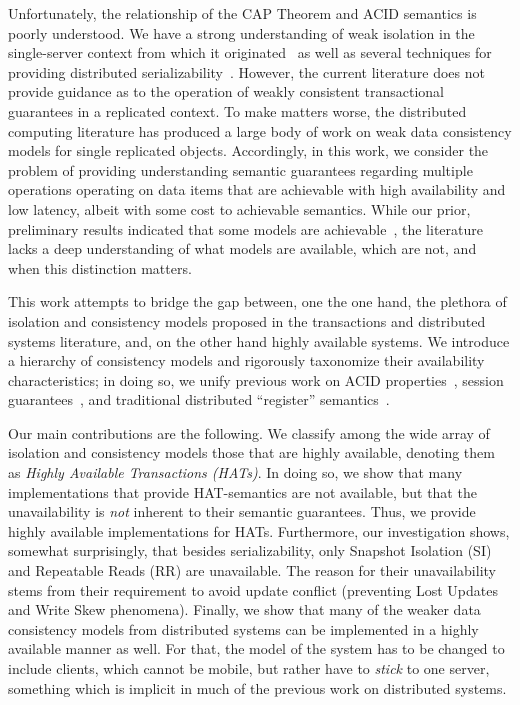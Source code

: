 Unfortunately, the relationship of the CAP Theorem and ACID semantics
is poorly understood. We have a strong understanding of weak isolation
in the single-server context from which it originated~\cite{adya,
  ansicritique, gray-isolation} as well as several techniques for
providing distributed serializability~\cite{bernstein-concurrency,
  spanner, granola, daudjee-session, calvin}.  However, the current
literature does not provide guidance as to the operation of weakly
consistent transactional guarantees in a replicated context. To make
matters worse, the distributed computing literature has produced a
large body of work on weak data consistency models for single
replicated objects. Accordingly, in this work, we consider the problem
of providing understanding semantic guarantees regarding multiple
operations operating on data items that are achievable with high
availability and low latency, albeit with some cost to achievable
semantics. While our prior, preliminary results indicated that some
models are achievable~\cite{hat-hotos}, the literature lacks a deep
understanding of what models are available, which are not, and when
this distinction matters.

This work attempts to bridge the gap between, one the one hand, the
plethora of isolation and consistency models proposed in the
transactions and distributed systems literature, and, on the other hand
highly available systems. We introduce a hierarchy of consistency
models and rigorously taxonomize their availability characteristics;
in doing so, we unify previous work on ACID properties~\cite{adya},
session guarantees~\cite{sessionguarantees}, and traditional
distributed ``register'' semantics~\cite{herlihy-art}. 


Our main contributions are the following. We classify among the wide
array of isolation and consistency models those that are highly
available, denoting them as {\em Highly Available Transactions
  (HATs)}.  In doing so, we show that many implementations that
provide HAT-semantics are not available, but that the unavailability
is {\em not} inherent to their semantic guarantees. Thus, we provide
highly available implementations for HATs.  Furthermore, our
investigation shows, somewhat surprisingly, that besides
serializability, only Snapshot Isolation (SI) and Repeatable Reads
(RR) are unavailable. The reason for their unavailability stems from
their requirement to avoid update conflict (preventing Lost Updates
and Write Skew phenomena). Finally, we show that many of the weaker
data consistency models from distributed systems can be implemented in
a highly available manner as well. For that, the model of the system
has to be changed to include clients, which cannot be mobile, but
rather have to {\em stick} to one server, something which is implicit
in much of the previous work on distributed systems.


